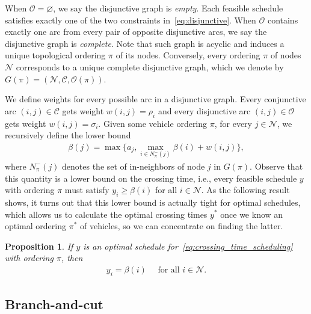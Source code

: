 \documentclass[a4paper]{article}
\theoremstyle{definition}
\theoremstyle{plain}
\newtheorem{proposition}{Proposition}
\begin{document}
When $\mathcal{O} = \varnothing$, we say the disjunctive graph is
\textit{empty}. Each feasible schedule satisfies exactly one of the two
constraints in~\eqref{eq:disjunctive}. When $\mathcal{O}$ contains exactly one arc from every pair
of opposite disjunctive arcs, we say the disjunctive graph is \textit{complete}.
Note that such graph is acyclic and induces a unique topological ordering $\pi$
of its nodes. Conversely, every ordering $\pi$ of nodes $\mathcal{N}$ corresponds
to a unique complete disjunctive graph, which we denote by
$G(\pi) = (\mathcal{N}, \mathcal{C}, \mathcal{O}(\pi))$.

We define weights for every possible arc in a disjunctive graph. Every
conjunctive arc $(i, j) \in \mathcal{C}$ gets weight $w(i,j) = \rho_{i}$ and every
disjunctive arc $(i, j) \in \mathcal{O}$ gets weight $w(i,j) = \sigma_{i}$. Given
some vehicle ordering $\pi$, for every $j \in \mathcal{N}$, we recursively define
the lower bound
\begin{align}
  \label{eq:lower_bounds}
  \beta(j) = \max\{ a_{j}, \max_{i \in N^{-}_{\pi}(j)} \beta(i) + w(i,j) \} ,
\end{align}
where $N^{-}_{\pi}(j)$ denotes the set of in-neighbors of node $j$ in $G(\pi)$.
Observe that this quantity is a lower bound on the crossing time, i.e., every
feasible schedule $y$ with ordering $\pi$ must satisfy $y_{i} \geq \beta(i)$
for all $i \in \mathcal{N}$.
%
As the following result shows, it turns out that this lower bound is actually tight for optimal schedules,
which allows us to calculate the optimal crossing times $y^{*}$ once we know an
optimal ordering $\pi^{*}$ of vehicles, so we can concentrate on finding the latter.

\begin{proposition}\label{prop:active-schedule}
  If $y$ is an optimal schedule
  for~\eqref{eq:crossing_time_scheduling} with ordering $\pi$, then
  \begin{align}
    \label{eq:optimality}
    y_{i} = \beta(i) \quad \text{ for all } i \in \mathcal{N} .
  \end{align}
\end{proposition}


\subsection{Branch-and-cut}
\label{sec:branch-and-cut}
\end{document}
